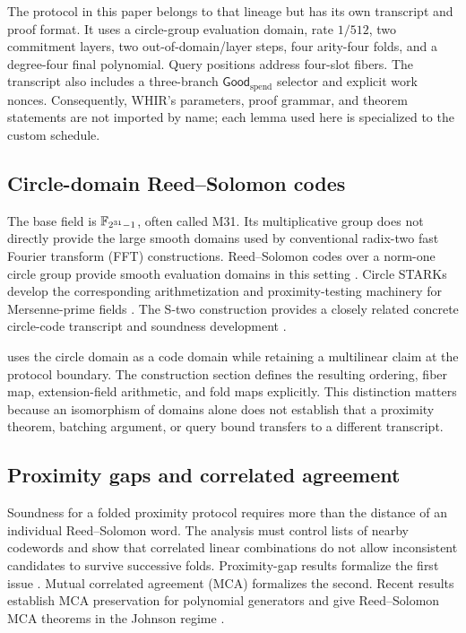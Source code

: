 The protocol in this paper belongs to that lineage but has its own transcript
and proof format.  It uses a circle-group evaluation domain, rate $1/512$, two
commitment layers, two out-of-domain/layer steps, four arity-four folds, and a
degree-four final polynomial.  Query positions address four-slot fibers.  The
transcript also includes a three-branch \(\mathsf{Good}_{\mathrm{spend}}\) selector and explicit
work nonces.  Consequently, WHIR's parameters, proof grammar, and theorem
statements are not imported by name; each lemma used here is specialized to
the custom schedule.

\subsection{Circle-domain Reed--Solomon codes}

The base field is $\mathbb{F}_{2^{31}-1}$, often called M31.  Its multiplicative group does
not directly provide the large smooth domains used by conventional radix-two
fast Fourier transform (FFT) constructions.  Reed--Solomon codes over a
norm-one circle group provide
smooth evaluation domains in this setting
\cite{HaboeckLubarovNabaglo2023}.
Circle STARKs develop the corresponding arithmetization and proximity-testing
machinery for Mersenne-prime fields
\cite{HaboeckLevitPapini2024}.  The S-two
construction provides a closely related concrete circle-code transcript and
soundness development \cite{CarmonEtAl2026Stwo}.

\Profile{} uses the circle domain as a code domain while retaining a
multilinear claim at the protocol boundary.  The construction section defines
the resulting ordering, fiber map, extension-field arithmetic, and fold maps
explicitly.  This distinction matters because an isomorphism of domains alone
does not establish that a proximity theorem, batching argument, or query
bound transfers to a different transcript.

\subsection{Proximity gaps and correlated agreement}

Soundness for a folded proximity protocol requires more than the distance of
an individual Reed--Solomon word.  The analysis must control lists of nearby
codewords and show that correlated linear combinations do not allow
inconsistent candidates to survive successive folds.  Proximity-gap results
formalize the first issue
\cite{BenSassonCarmonIshaiKoppartySaraf2023}.  Mutual correlated
agreement (MCA) formalizes the second.  Recent results establish MCA
preservation for polynomial generators and give Reed--Solomon MCA theorems in
the Johnson regime
\cite{BordageChiesaGuanManzur2025,Haboeck2025MCA}.

